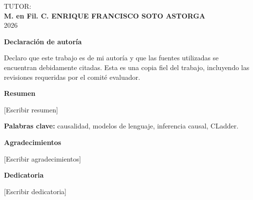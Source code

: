 \begin{titlepage}
\begin{minipage}[t]{0.70\textwidth}
      \vspace{1cm}
      {\normalsize TUTOR:}\\[0.15cm]
      {\large\bfseries M. en Fil. C. ENRIQUE FRANCISCO SOTO ASTORGA}\\

      \vspace{1cm}
      {\large 2026}
  \end{minipage}
  \vspace{-2.0cm}
  \hspace{0.02\textwidth}
\end{titlepage}

\pagestyle{plain}
\setcounter{page}{2}

\cleardoublepage
{}
{}
\begin{center}\textbf{Declaración de autoría}\end{center}
Declaro que este trabajo es de mi autoría y que las fuentes utilizadas se encuentran debidamente citadas. Esta es una copia fiel del trabajo, incluyendo las revisiones requeridas por el comité evaluador.

\cleardoublepage
{}
{}
\begin{center}\textbf{Resumen}\end{center}
[Escribir resumen]

\vspace{1em}
\noindent\textbf{Palabras clave:} causalidad, modelos de lenguaje, inferencia causal, CLadder.

\cleardoublepage
{}
{}
\begin{center}\textbf{Agradecimientos}\end{center}
[Escribir agradecimientos]

\cleardoublepage
{}
{}
\begin{center}\textbf{Dedicatoria}\end{center}
[Escribir dedicatoria]

\cleardoublepage
{}
\renewcommand\contentsname{Contenido}
\tableofcontents

\cleardoublepage
{}
{}
\listoffigures

\cleardoublepage
{}
{}
\listoftables

\cleardoublepage
{}
\renewcommand*{\abbreviationsname}{Lista de abreviaturas}
\printglossary[type=abbreviations]

\cleardoublepage
{}
\printglossary[type=symbols]

